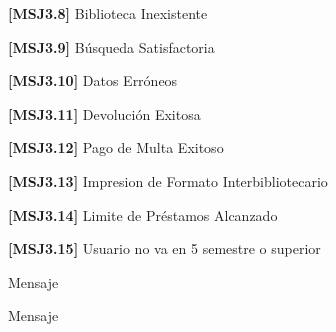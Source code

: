 	\begin{Citemize}
	\item {\bf [MSJ3.8]} Biblioteca Inexistente
	\end{Citemize}
	
	\begin{Citemize}
	\item {\bf [MSJ3.9]} Búsqueda Satisfactoria
	\end{Citemize}
	
	\begin{Citemize}
	\item {\bf [MSJ3.10]} Datos Erróneos
	\end{Citemize}
	
	\begin{Citemize}
	\item {\bf [MSJ3.11]} Devolución Exitosa
	\end{Citemize}
	
	\begin{Citemize}
	\item {\bf [MSJ3.12]} Pago de Multa Exitoso
	\end{Citemize}
	
	\begin{Citemize}
	\item {\bf [MSJ3.13]} Impresion de Formato Interbibliotecario
	\end{Citemize}
	
	\begin{Citemize}
	\item {\bf [MSJ3.14]} Limite de Préstamos Alcanzado
	\end{Citemize}
	
	\begin{Citemize}
	\item {\bf [MSJ3.15]} Usuario no va en 5 semestre o superior
	\end{Citemize}
	
\begin{Citemize}
	\item Mensaje 
\end{Citemize}

\begin{Citemize}	
	\item Mensaje 
\end{Citemize}

